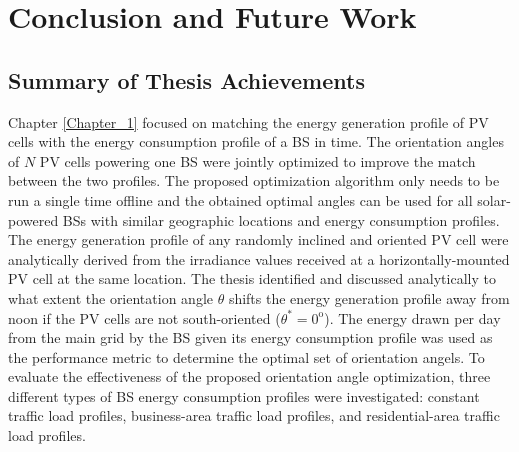 \clearpage
\chapter{Conclusion and Future Work\label{conclusion}}



\section{Summary of Thesis Achievements}

Chapter \ref{Chapter_1} focused on matching the energy generation profile of PV cells with the energy consumption profile of a BS in time. The orientation angles of $N$ PV cells powering one BS were jointly optimized to improve the match between the two profiles. The proposed optimization algorithm only needs to be run a single time offline and the obtained optimal angles can be used for all solar-powered BSs with similar geographic locations and energy consumption profiles.
The energy generation profile of any randomly inclined and oriented PV cell were analytically derived from the irradiance values received at a horizontally-mounted PV cell at the same location. The thesis identified and discussed analytically to what extent the orientation angle $\theta$ shifts the energy generation profile away from noon if the PV cells are not south-oriented ($\theta^*=0^{\mathrm{o}} $).
The energy drawn per day from the main grid by the BS given its energy consumption profile was used as the performance metric to determine the optimal set of orientation angels. To evaluate the effectiveness of the proposed orientation angle optimization, three different types of BS energy consumption profiles were investigated: constant traffic load profiles, business-area traffic load profiles, and residential-area traffic load
profiles.

